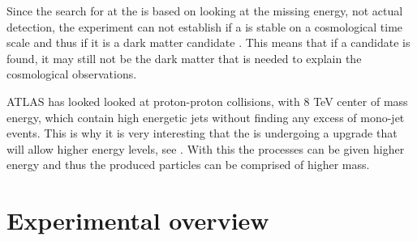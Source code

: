 Since the search for \abbrWIMPS at the \abbrLHC is based on looking at the missing energy, not actual detection, the experiment can not establish if a \abbrWIMP is stable on a cosmological time scale and thus if it is a dark matter candidate \citep{CERN-PH-EP-2012-210}. This means that if a candidate is found, it may still not be the dark matter that is needed to explain the cosmological observations.

ATLAS has looked looked at proton-proton collisions, with 8 TeV center of mass energy, which contain high energetic jets without finding any excess of mono-jet events. This is why it is very interesting that the \abbrLHC is undergoing a upgrade that will allow higher energy levels, see . With this the processes can be given higher energy and thus the produced particles can be comprised of higher mass. 
\newpage
\section{Experimental overview}\label{sec:experiment}

